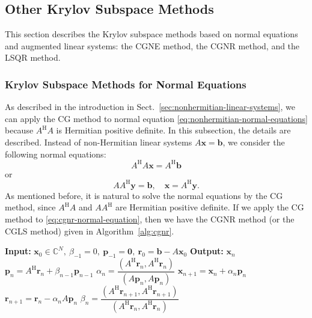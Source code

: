 \subsection{{Other Krylov Subspace Methods}}\label{sec:other-krylov-methods}
{This section describes the Krylov subspace methods based on normal equations and augmented linear systems: the CGNE method, the CGNR method, and the LSQR method.}
\subsubsection{{Krylov Subspace Methods for Normal Equations}}\label{subsec:cg-normal-equations}
{As described in the introduction in Sect.\ \ref{sec:nonhermitian-linear-systems}, we can apply the CG method to normal equation \eqref{eq:nonhermitian-normal-equations} because $A^{\mathrm H}A$ is Hermitian positive definite. In this subsection, the details are described. Instead of non-Hermitian linear systems $A\bm x=\bm b$, we consider the following normal equations:}
\begin{equation}\label{eq:cgnr-normal-equation}A^{\mathrm H}A\bm x=A^{\mathrm H}\bm b\end{equation}
{or}
\begin{equation}\label{eq:cgne-normal-equation}AA^{\mathrm H}\bm y=\bm b,\quad\bm x=A^{\mathrm H}\bm y.\end{equation}
{As mentioned before, it is natural to solve the normal equations by the CG method, since $A^{\mathrm H}A$ and $AA^{\mathrm H}$ are Hermitian positive definite. If we apply the CG method to \eqref{eq:cgnr-normal-equation}, then we have the CGNR method (or the CGLS method)  given in Algorithm\ \ref{alg:cgnr}.}
\begin{algorithm}[H]\caption{{The CGNR method}}\label{alg:cgnr}\begin{algorithmic}[1]
\Statex\textbf{Input:} $\bm x_0\in\mathbb C^N,\ \beta_{-1}=0,\ \bm p_{-1}=\bm0,\ \bm r_0=\bm b-A\bm x_0$
\Statex\textbf{Output:} $\bm x_n$
\State $\bm p_n=A^{\mathrm H}\bm r_n+\beta_{n-1}\bm p_{n-1}$
\State $\alpha_n=\dfrac{(A^{\mathrm H}\bm r_n,A^{\mathrm H}\bm r_n)}{(A\bm p_n,A\bm p_n)}$
\State $\bm x_{n+1}=\bm x_n+\alpha_n\bm p_n$
\State $\bm r_{n+1}=\bm r_n-\alpha_nA\bm p_n$
\State $\beta_n=\dfrac{(A^{\mathrm H}\bm r_{n+1},A^{\mathrm H}\bm r_{n+1})}{(A^{\mathrm H}\bm r_n,A^{\mathrm H}\bm r_n)}$
\EndFor\end{algorithmic}\end{algorithm}
